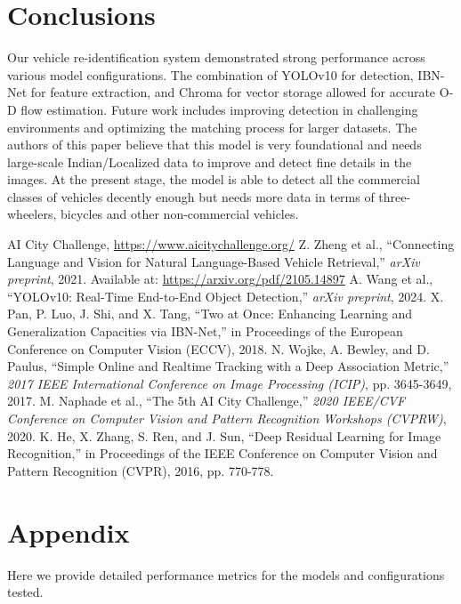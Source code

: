 \documentclass[11pt]{IEEEtran}
\begin{document}
\section{Conclusions}
Our vehicle re-identification system demonstrated strong performance across
various model configurations. The combination of YOLOv10 for detection, IBN-Net
for feature extraction, and Chroma for vector storage allowed for accurate O-D
flow estimation. Future work includes improving detection in challenging
environments and optimizing the matching process for larger datasets. The
authors of this paper believe that this model is very foundational and needs
large-scale Indian/Localized data to improve and detect fine details in the
images. At the present stage, the model is able to detect all the commercial
classes of vehicles decently enough but needs more data in terms of
three-wheelers, bicycles and other non-commercial vehicles.

\begin{thebibliography}{9}
     AI City Challenge, \url{https://www.aicitychallenge.org/}
     Z. Zheng et al., ``Connecting Language and Vision for
    Natural Language-Based Vehicle Retrieval,'' \emph{arXiv preprint}, 2021.
    Available at: \url{https://arxiv.org/pdf/2105.14897}
     A. Wang et al., ``YOLOv10: Real-Time End-to-End
    Object Detection,'' \emph{arXiv preprint}, 2024.
     X. Pan, P. Luo, J. Shi, and X. Tang, ``Two at
    Once: Enhancing Learning and Generalization Capacities via IBN-Net,'' in
    Proceedings of the European Conference on Computer Vision (ECCV), 2018.
     N. Wojke, A. Bewley, and D. Paulus, ``Simple
    Online and Realtime Tracking with a Deep Association Metric,'' \emph{2017
        IEEE
        International Conference on Image Processing (ICIP)}, pp. 3645-3649,
    2017.
     M. Naphade et al., ``The 5th AI City Challenge,''
    \emph{2020 IEEE/CVF Conference on Computer Vision and Pattern Recognition
        Workshops (CVPRW)}, 2020.
     K. He, X. Zhang, S. Ren, and J. Sun, ``Deep Residual
    Learning for Image Recognition,'' in Proceedings of the IEEE Conference on
    Computer Vision and Pattern Recognition (CVPR), 2016, pp. 770-778.
\end{thebibliography}

\appendix
\section{Appendix}
Here we provide detailed performance metrics for the models and configurations
tested.
\end{document}
